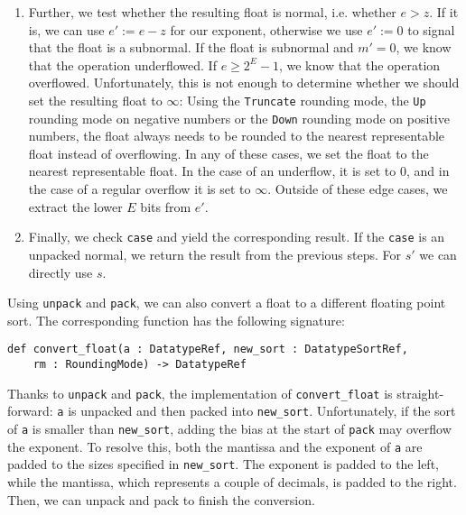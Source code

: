 \documentclass[a4paper,UKenglish,cleveref, autoref, thm-restate]{lipics-v2019}
\begin{document}
\begin{enumerate}
	\item Further, we test whether the resulting float is normal, i.e. whether $e > z$. If it is, we can use $e' := e - z$ for our exponent, otherwise we use $e' := 0$ to signal that the float is a subnormal. If the float is subnormal and $m' = 0$, we know that the operation underflowed. If $e \geq 2^E - 1$, we know that the operation overflowed. Unfortunately, this is not enough to determine whether we should set the resulting float to $\infty$: Using the \verb|Truncate| rounding mode, the \verb|Up| rounding mode on negative numbers or the \verb|Down| rounding mode on positive numbers, the float always needs to be rounded to the nearest representable float instead of overflowing. In any of these cases, we set the float to the nearest representable float. In the case of an underflow, it is set to $0$, and in the case of a regular overflow it is set to $\infty$. Outside of these edge cases, we extract the lower $E$ bits from $e'$.
	\item Finally, we check \verb|case| and yield the corresponding result. If the \verb|case| is an unpacked normal, we return the result from the previous steps. For $s'$ we can directly use $s$.
\end{enumerate}

Using \verb|unpack| and \verb|pack|, we can also convert a float to a different floating point sort. The corresponding function has the following signature:
\begin{lstlisting}
def convert_float(a : DatatypeRef, new_sort : DatatypeSortRef, 
    rm : RoundingMode) -> DatatypeRef
\end{lstlisting}
Thanks to \verb|unpack| and \verb|pack|, the implementation of \verb|convert_float| is straight-forward: \verb|a| is unpacked and then packed into \verb|new_sort|. Unfortunately, if the sort of \verb|a| is smaller than \verb|new_sort|, adding the bias at the start of \verb|pack| may overflow the exponent. To resolve this, both the mantissa and the exponent of \verb|a| are padded to the sizes specified in \verb|new_sort|. The exponent is padded to the left, while the mantissa, which represents a couple of decimals, is padded to the right.
Then, we can unpack and pack to finish the conversion.
\end{document}
